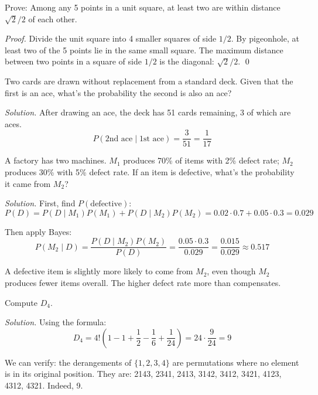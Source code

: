 \begin{example}
Prove: Among any 5 points in a unit square, at least two are within distance $\sqrt{2}/2$ of each other.

\emph{Proof.} Divide the unit square into 4 smaller squares of side $1/2$. By pigeonhole, at least two of the 5 points lie in the same small square. The maximum distance between two points in a square of side $1/2$ is the diagonal: $\sqrt{2}/2$. \qed
\end{example}

\begin{example}
Two cards are drawn without replacement from a standard deck. Given that the first is an ace, what's the probability the second is also an ace?

\emph{Solution.} After drawing an ace, the deck has 51 cards remaining, 3 of which are aces.
\[
P(\text{2nd ace} \mid \text{1st ace}) = \frac{3}{51} = \frac{1}{17}
\]
\end{example}

\begin{example}
A factory has two machines. $M_1$ produces 70\% of items with 2\% defect rate; $M_2$ produces 30\% with 5\% defect rate. If an item is defective, what's the probability it came from $M_2$?

\emph{Solution.} First, find $P(\text{defective})$:
\[
P(D) = P(D \mid M_1)P(M_1) + P(D \mid M_2)P(M_2) = 0.02 \cdot 0.7 + 0.05 \cdot 0.3 = 0.029
\]

Then apply Bayes:
\[
P(M_2 \mid D) = \frac{P(D \mid M_2)P(M_2)}{P(D)} = \frac{0.05 \cdot 0.3}{0.029} = \frac{0.015}{0.029} \approx 0.517
\]

A defective item is slightly more likely to come from $M_2$, even though $M_2$ produces fewer items overall. The higher defect rate more than compensates.
\end{example}

\begin{example}
Compute $D_4$.

\emph{Solution.} Using the formula:
\[
D_4 = 4! \left(1 - 1 + \frac{1}{2} - \frac{1}{6} + \frac{1}{24}\right) = 24 \cdot \frac{9}{24} = 9
\]

We can verify: the derangements of $\{1,2,3,4\}$ are permutations where no element is in its original position. They are: 2143, 2341, 2413, 3142, 3412, 3421, 4123, 4312, 4321. Indeed, 9.
\end{example}

